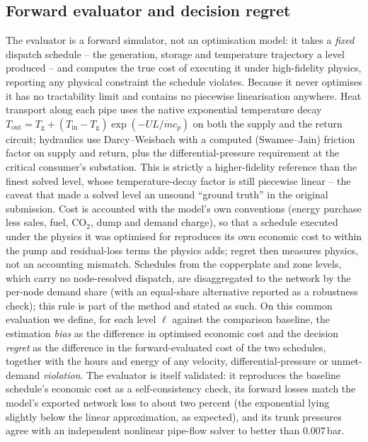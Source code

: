 \documentclass[a4paper,fleqn]{cas-dc}
\begin{document}
\subsection{Forward evaluator and decision regret}
\label{subsec:evaluator}
The evaluator is a forward simulator, not an optimisation model: it takes a \emph{fixed}
dispatch schedule -- the generation, storage and temperature trajectory a level produced --
and computes the true cost of executing it under high-fidelity physics, reporting any physical
constraint the schedule violates. Because it never optimises it has no tractability limit and
contains no piecewise linearisation anywhere. Heat transport along each pipe uses the native
exponential temperature decay $T_\text{out}=T_\text{g}+(T_\text{in}-T_\text{g})\exp(-U L/\dot m
c_p)$ on both the supply and the return circuit; hydraulics use Darcy--Weisbach with a
computed (Swamee--Jain) friction factor on supply and return, plus the differential-pressure
requirement at the critical consumer's substation. This is strictly a higher-fidelity
reference than the finest solved level, whose temperature-decay factor is still piecewise
linear -- the caveat that made a solved level an unsound ``ground truth'' in the original
submission. Cost is accounted with the model's own conventions (energy purchase less sales,
fuel, CO$_2$, dump and demand charge), so that a schedule executed under the physics it was
optimised for reproduces its own economic cost to within the pump and residual-loss terms
the physics adds; regret then measures physics, not an accounting mismatch. Schedules from the
copperplate and zone levels, which carry no node-resolved dispatch, are disaggregated to the
network by the per-node demand share (with an equal-share alternative reported as a
robustness check); this rule is part of the method and stated as such. On this common
evaluation we define, for each level $\ell$ against the comparison baseline, the estimation
\emph{bias} as the difference in optimised economic cost and the decision \emph{regret} as the
difference in the forward-evaluated cost of the two schedules, together with the hours and
energy of any velocity, differential-pressure or unmet-demand \emph{violation}. The evaluator
is itself validated: it reproduces the baseline schedule's economic cost as a self-consistency
check, its forward losses match the model's exported network loss to about two percent (the
exponential lying slightly below the linear approximation, as expected), and its trunk
pressures agree with an independent nonlinear pipe-flow solver to better than $0.007$\,bar.
\end{document}
